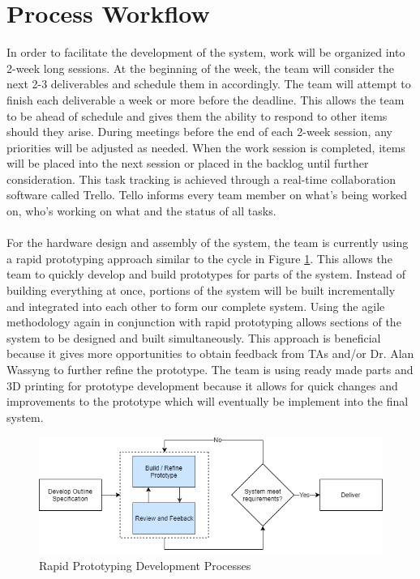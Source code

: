 \documentclass[11pt]{article}
\begin{document}
\section{Process Workflow}
In order to facilitate the development of the system, work will be organized into 2-week long sessions. At the beginning of the week, the team will consider the next 2-3 deliverables and schedule them in accordingly. The team will attempt to finish each deliverable a week or more before the deadline. This allows the team to be ahead of schedule and gives them the ability to respond to other items should they arise. During meetings before the end of each 2-week session, any priorities will be adjusted as needed. When the work session is completed, items will be placed into the next session or placed in the backlog until further consideration. This task tracking is achieved through a real-time collaboration software called Trello. Tello informs every team member on what's being worked on, who's working on what and the status of all tasks.   \\\\
For the hardware design and assembly of the system, the team is currently using a rapid prototyping approach similar to the cycle in Figure \ref{fig:rapid}. This allows the team to quickly develop and build prototypes for parts of the system. Instead of building everything at once, portions of the system will be built incrementally and integrated into each other to form our complete system. Using the agile methodology again in conjunction with rapid prototyping allows sections of the system to be designed and built simultaneously. This approach is beneficial because it gives more opportunities to obtain feedback from TAs and/or Dr. Alan Wassyng to further refine the prototype. The team is using ready made parts and 3D printing for prototype development because it allows for quick changes and improvements to the prototype which will eventually be implement into the final system.
\begin{figure}
	\centering
	\includegraphics[width=.8\textwidth]{img/Rapid-Prototyping-Dev-Process.png}
	\caption{Rapid Prototyping Development Processes}
	\label{fig:rapid}
\end{figure}
\end{document}

